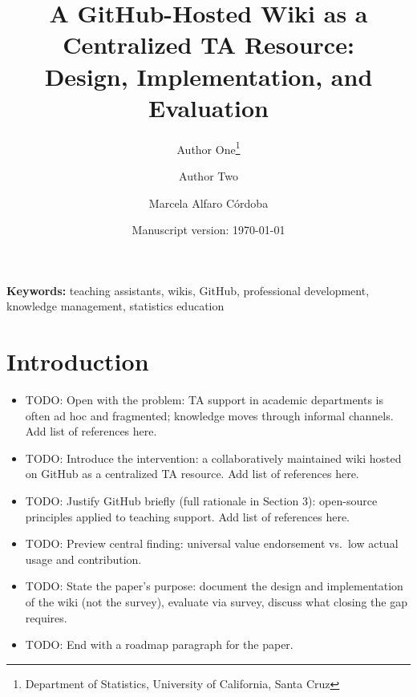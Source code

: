 \documentclass[11pt]{article}
\title{A GitHub-Hosted Wiki as a Centralized TA Resource:\\
Design, Implementation, and Evaluation}
\author{Author One\thanks{Department of Statistics, University of California, Santa Cruz} \and Author Two \and Marcela Alfaro Córdoba}
\date{Manuscript version: \today}
\newcommand{\td}[1]{\item \textcolor{red!70!black}{TODO: #1}}
\begin{document}
\maketitle

\begin{abstract}
\end{abstract}

\noindent\textbf{Keywords:} teaching assistants, wikis, GitHub, professional development, knowledge management, statistics education

\section{Introduction}


\begin{itemize}
  \td{Open with the problem: TA support in academic departments is often ad hoc and fragmented; knowledge moves through informal channels. Add list of references here.}
  \td{Introduce the intervention: a collaboratively maintained wiki hosted on GitHub as a centralized TA resource. Add list of references here.}
  \td{Justify GitHub briefly (full rationale in Section 3): open-source principles applied to teaching support. Add list of references here.}
  \td{Preview central finding: universal value endorsement vs.\ low actual usage and contribution.}
  \td{State the paper's purpose: document the design and implementation of the wiki (not the survey), evaluate via survey, discuss what closing the gap requires.}
  \td{End with a roadmap paragraph for the paper.}
\end{itemize}
\end{document}
